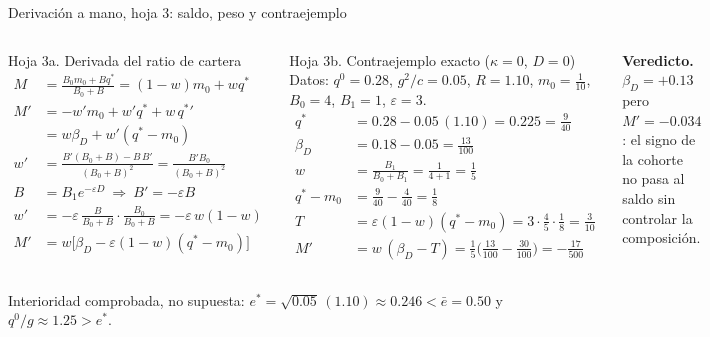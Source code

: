 \documentclass[aspectratio=169,10pt,t]{beamer}
\newcommand{\source}[1]{\par\vfill{\fontsize{6}{7.2}\selectfont\color{soft}#1\par}}
\newcommand{\qz}{q^{0}}
\newcommand{\qs}{q^{*}}
\newcommand{\es}{e^{*}}
\newcommand{\eb}{\bar e}
\begin{document}
\begin{frame}{Derivación a mano, hoja 3: saldo, peso y contraejemplo}
\vspace{-1mm}
\begin{columns}[T,onlytextwidth]
\begin{hoja}{Hoja 3a. Derivada del ratio de cartera}
\small
\vspace{-3mm}
\begin{align*}
M&=\tfrac{B_{0}m_{0}+B\qs}{B_{0}+B}=(1-w)m_{0}+w\qs\\
M'&=-w'm_{0}+w'\qs+w\,\qs{}'\\
&=w\beta_{D}+w'(\qs-m_{0})\\[.6mm]
w'&=\frac{B'(B_{0}+B)-B\,B'}{(B_{0}+B)^{2}}=\frac{B'B_{0}}{(B_{0}+B)^{2}}\\
B&=B_{1}e^{-\varepsilon D}\ \Rightarrow\ B'=-\varepsilon B\\
w'&=-\varepsilon\,\tfrac{B}{B_{0}+B}\cdot\tfrac{B_{0}}{B_{0}+B}=-\varepsilon\,w(1-w)\\[.6mm]
M'&=w\bigl[\beta_{D}-\varepsilon(1-w)(\qs-m_{0})\bigr]
\end{align*}
\vspace{-4mm}
\end{hoja}
\begin{hoja}{Hoja 3b. Contraejemplo exacto ($\kappa=0$, $D=0$)}
\footnotesize Datos: $\qz=0.28$, $g^{2}/c=0.05$, $R=1.10$, $m_{0}=\tfrac1{10}$, $B_{0}=4$,
$B_{1}=1$, $\varepsilon=3$.
\begin{align*}
\qs&=0.28-0.05\,(1.10)=0.225=\tfrac{9}{40}\\
\beta_{D}&=0.18-0.05=\tfrac{13}{100}\\
w&=\tfrac{B_{1}}{B_{0}+B_{1}}=\tfrac{1}{4+1}=\tfrac15\\
\qs-m_{0}&=\tfrac{9}{40}-\tfrac{4}{40}=\tfrac18\\
T&=\varepsilon(1-w)(\qs-m_{0})=3\cdot\tfrac45\cdot\tfrac18=\tfrac{3}{10}\\
M'&=w\,(\beta_{D}-T)=\tfrac15\bigl(\tfrac{13}{100}-\tfrac{30}{100}\bigr)=-\tfrac{17}{500}
\end{align*}
\vspace{-4mm}
\end{hoja}
\vspace{-.5mm}
\begin{keybox}\footnotesize
\textbf{Veredicto.} $\beta_{D}=+0.13$ pero $M'=-0.034$: el signo de la cohorte no
pasa al saldo sin controlar la composición.
\end{keybox}
\end{columns}
\source{Interioridad comprobada, no supuesta: $\es=\sqrt{0.05}\,(1.10)\approx
0.246<\eb=0.50$ y $\qz/g\approx 1.25>\es$.}
\end{frame}
\end{document}
